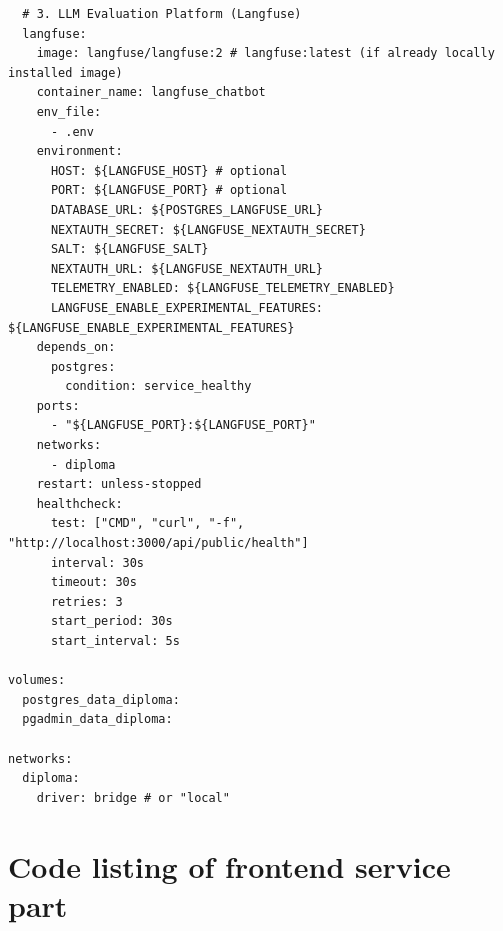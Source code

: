 \begin{lstlisting}
  # 3. LLM Evaluation Platform (Langfuse)
  langfuse:
    image: langfuse/langfuse:2 # langfuse:latest (if already locally installed image)
    container_name: langfuse_chatbot
    env_file:
      - .env
    environment:
      HOST: ${LANGFUSE_HOST} # optional
      PORT: ${LANGFUSE_PORT} # optional
      DATABASE_URL: ${POSTGRES_LANGFUSE_URL}
      NEXTAUTH_SECRET: ${LANGFUSE_NEXTAUTH_SECRET}
      SALT: ${LANGFUSE_SALT}
      NEXTAUTH_URL: ${LANGFUSE_NEXTAUTH_URL}
      TELEMETRY_ENABLED: ${LANGFUSE_TELEMETRY_ENABLED}
      LANGFUSE_ENABLE_EXPERIMENTAL_FEATURES: ${LANGFUSE_ENABLE_EXPERIMENTAL_FEATURES}
    depends_on:
      postgres:
        condition: service_healthy
    ports:
      - "${LANGFUSE_PORT}:${LANGFUSE_PORT}"
    networks:
      - diploma
    restart: unless-stopped
    healthcheck:
      test: ["CMD", "curl", "-f", "http://localhost:3000/api/public/health"]
      interval: 30s
      timeout: 30s
      retries: 3
      start_period: 30s
      start_interval: 5s

volumes:
  postgres_data_diploma:
  pgadmin_data_diploma:

networks:
  diploma:
    driver: bridge # or "local"
\end{lstlisting}

\clearpage

\chapter{Code listing of frontend service part}

